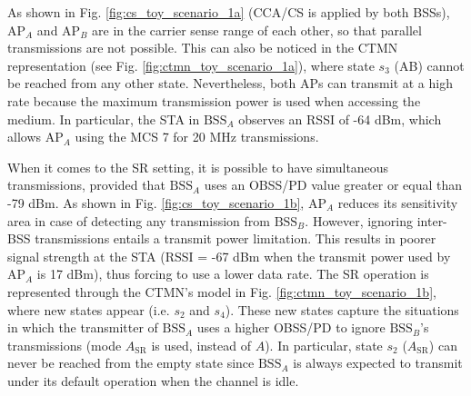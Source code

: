 \documentclass{ieeeaccess}
\begin{document}
As shown in Fig. \ref{fig:cs_toy_scenario_1a} (CCA/CS is applied by both BSSs), $\text{AP}_A$ and $\text{AP}_B$ are in the carrier sense range of each other, so that parallel transmissions are not possible. This can also be noticed in the CTMN representation (see Fig. \ref{fig:ctmn_toy_scenario_1a}), where state $s_3$ (AB) cannot be reached from any other state. Nevertheless, both APs can transmit at a high rate because the maximum transmission power is used when accessing the medium. In particular, the STA in $\text{BSS}_A$ observes an RSSI of -64 dBm, which allows $\text{AP}_A$ using the MCS 7 for 20 MHz transmissions.

When it comes to the SR setting, it is possible to have simultaneous transmissions, provided that $\text{BSS}_A$ uses an OBSS/PD value greater or equal than -79 dBm. As shown in Fig. \ref{fig:cs_toy_scenario_1b}, $\text{AP}_A$ reduces its sensitivity area in case of detecting any transmission from $\text{BSS}_B$. However, ignoring inter-BSS transmissions entails a transmit power limitation. This results in poorer signal strength at the STA (RSSI = -67 dBm when the transmit power used by AP$_A$ is 17 dBm), thus forcing to use a lower data rate. The SR operation is represented through the CTMN's model in Fig. \ref{fig:ctmn_toy_scenario_1b}, where new states appear (i.e. $s_2$ and $s_4$). These new states capture the situations in which the transmitter of $\text{BSS}_A$ uses a higher OBSS/PD to ignore $\text{BSS}_B$'s transmissions (mode $A_\text{SR}$ is used, instead of $A$). In particular, state $s_2$ ($A_\text{SR}$) can never be reached from the empty state since $\text{BSS}_A$ is always expected to transmit under its default operation when the channel is idle.
\end{document}
